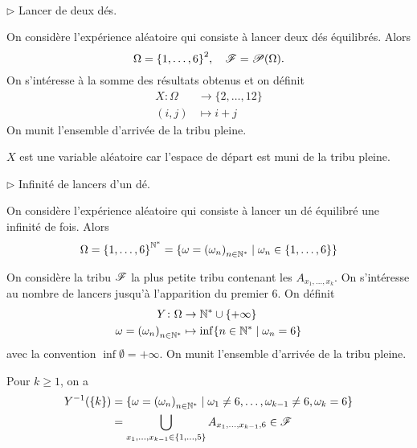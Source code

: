 \begin{exs}\,\\
    \(\triangleright\) Lancer de deux dés.

    On considère l'expérience aléatoire qui consiste à lancer deux dés équilibrés. Alors
    \begin{equation*}
        \Omega = {\{1,\dots,6\}}^2,\quad \mathscr{F} = \mathscr{P}(\Omega).
    \end{equation*}
    On s'intéresse à la somme des résultats obtenus et on définit
    \begin{equation*}
        \begin{aligned}
            X\colon \Omega&\to \{2,\dots,12\}\\
            (i,j) &\mapsto i+j
        \end{aligned}
    \end{equation*}
    On munit l'ensemble d'arrivée de la tribu pleine.

    \(X\) est une variable aléatoire car l'espace de départ est muni de la tribu pleine.

    \(\triangleright\) Infinité de lancers d'un dé.

    On considère l'expérience aléatoire qui consiste à lancer un dé équilibré une infinité de fois. Alors
    \begin{equation*}
        \Omega = {\{1,\dots,6\}}^{\mathbb{N}^\ast} = \{\omega = {(\omega_n)}_{n\in\mathbb{N}^\ast}\mid \omega_n\in\{1,\dots,6\}\}
    \end{equation*}

    On considère la tribu \(\mathscr{F}\) la plus petite tribu contenant les \(A_{x_1,\dots,x_k}\). On s'intéresse
    au nombre de lancers jusqu'à l'apparition du premier 6. On définit
    \begin{equation*}
        \begin{aligned}
            Y\colon \Omega&\to \mathbb{N}^\ast\cup\{+\infty\}\\
            \omega ={{(\omega_n)}_{n\in\mathbb{N}^\ast}}&\mapsto \inf\{n\in\mathbb{N}^\ast\mid \omega_n = 6\}
        \end{aligned}
    \end{equation*}
    avec la convention \(\inf\emptyset = +\infty\). On munit l'ensemble d'arrivée de la tribu pleine.

    Pour \(k\geq 1\), on a
    \begin{equation*}
        \begin{aligned}
            Y^{-1}(\{k\}) 
            &= \{\omega={(\omega_n)}_{n\in\mathbb{N}^\ast}\mid \omega_1\ne 6,\dots,\omega_{k-1}\ne 6,\omega_k = 6\}\\
            &= \bigcup_{x_1,\dots,x_{k-1}\in\{1,\dots,5\}}A_{x_1,\dots,x_{k-1},6}\in\mathscr{F}
        \end{aligned}
    \end{equation*}


\end{exs}
